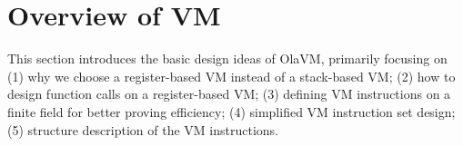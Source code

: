 \section{Overview of VM} \label{sec:overview-of-vm}

This section introduces the basic design ideas of OlaVM, primarily focusing on
(1) why we choose a register-based VM instead of a stack-based VM;
(2) how to design function calls on a register-based VM;
(3) defining VM instructions on a finite field for better proving efficiency;
(4) simplified VM instruction set design;
(5) structure description of the VM instructions.






